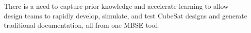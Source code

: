 There is a need to capture prior knowledge and accelerate learning to allow design teams to rapidly develop, simulate, and test CubeSat designs and generate traditional documentation, all from one MBSE tool.


